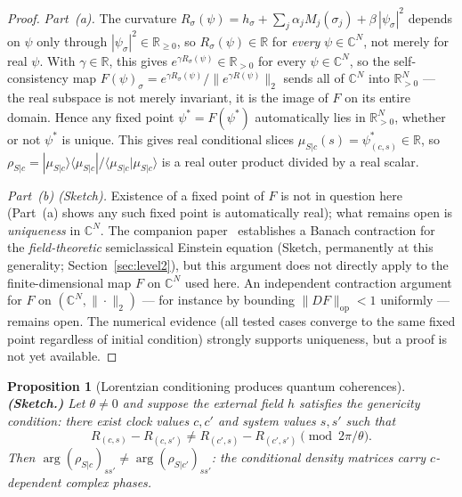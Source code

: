 \documentclass[12pt,a4paper]{article}
\newtheorem{proposition}{Proposition}
\theoremstyle{definition}
\theoremstyle{remark}
\begin{document}
\begin{proof}
\emph{Part~(a).} The curvature $R_\sigma(\psi) = h_\sigma + \sum_j \alpha_j M_j(\sigma_j) +
\beta\,|\psi_\sigma|^2$ depends on $\psi$ only through $|\psi_\sigma|^2 \in
\mathbb{R}_{\ge 0}$, so $R_\sigma(\psi) \in \mathbb{R}$ for \emph{every}
$\psi \in \mathbb{C}^N$, not merely for real $\psi$. With $\gamma \in
\mathbb{R}$, this gives $e^{\gamma R_\sigma(\psi)} \in \mathbb{R}_{>0}$ for
every $\psi \in \mathbb{C}^N$, so the self-consistency map
$F(\psi)_\sigma = e^{\gamma R_\sigma(\psi)} / \|e^{\gamma R(\psi)}\|_2$
sends all of $\mathbb{C}^N$ into $\mathbb{R}^N_{>0}$ --- the real
subspace is not merely invariant, it is the image of $F$ on its entire
domain. Hence any fixed point $\psi^* = F(\psi^*)$ automatically lies in
$\mathbb{R}^N_{>0}$, whether or not $\psi^*$ is unique. This gives real
conditional slices $\mu_{S|c}(s) = \psi^*_{(c,s)} \in \mathbb{R}$, so
$\rho_{S|c} = |\mu_{S|c}\rangle\langle\mu_{S|c}| /
\langle\mu_{S|c}|\mu_{S|c}\rangle$ is a real outer product divided by a
real scalar.

\emph{Part~(b) (Sketch).} Existence of a fixed point of $F$ is not in
question here (Part~(a) shows any such fixed point is automatically real);
what remains open is \emph{uniqueness} in $\mathbb{C}^N$. The companion
paper~\cite{fixed_point} establishes a Banach contraction for
the \emph{field-theoretic} semiclassical Einstein equation (Sketch,
permanently at this generality; Section~\ref{sec:level2}), but this
argument does not directly apply to the finite-dimensional map $F$ on
$\mathbb{C}^N$ used here. An independent contraction argument for $F$
on $(\mathbb{C}^N, \|\cdot\|_2)$ --- for instance by bounding
$\|DF\|_{\mathrm{op}} < 1$ uniformly --- remains open. The numerical
evidence (all tested cases converge to the same fixed point regardless of
initial condition) strongly supports uniqueness, but a proof is not yet
available.
\end{proof}

\begin{proposition}[Lorentzian conditioning produces quantum coherences]
\textbf{(Sketch.)}
\label{prop:lor_quantum}
Let $\theta \neq 0$ and suppose the external field $h$ satisfies the
genericity condition: there exist clock values $c, c'$ and system
values $s, s'$ such that
\begin{equation}
R_{(c,s)} - R_{(c,s')} \neq R_{(c',s)} - R_{(c',s')} \pmod{2\pi/\theta}.
\label{eq:genericity}
\end{equation}
Then $\arg(\rho_{S|c})_{ss'} \neq \arg(\rho_{S|c'})_{ss'}$: the
conditional density matrices carry $c$-dependent complex phases.
\end{proposition}
\end{document}

